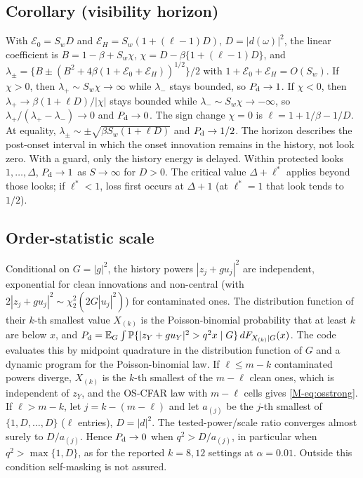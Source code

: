 \subsection{Corollary (visibility horizon)}
With $\mathcal E_0=S_wD$ and $\mathcal E_H=S_w(1+(\ell-1)D)$, $D=|d(\omega)|^2$, the linear coefficient is $B=1-\beta+S_w\chi$, $\chi=D-\beta\{1+(\ell-1)D\}$, and $\lambda_\pm=\{B\pm(B^2+4\beta(1+\mathcal E_0+\mathcal E_H))^{1/2}\}/2$ with $1+\mathcal E_0+\mathcal E_H=O(S_w)$. If $\chi>0$, then $\lambda_+\sim S_w\chi\to\infty$ while $\lambda_-$ stays bounded, so $P_{\rm d}\to1$. If $\chi<0$, then $\lambda_+\to\beta(1+\ell D)/|\chi|$ stays bounded while $\lambda_-\sim S_w\chi\to-\infty$, so $\lambda_+/(\lambda_+-\lambda_-)\to0$ and $P_{\rm d}\to0$. The sign change $\chi=0$ is $\ell=1+1/\beta-1/D$. At equality, $\lambda_\pm\sim\pm\sqrt{\beta S_w(1+\ell D)}$ and $P_{\rm d}\to1/2$. The horizon describes the post-onset interval in which the onset innovation remains in the history, not look zero. With a guard, only the history energy is delayed. Within protected looks $1,\ldots,\Delta$, $P_{\rm d}\to1$ as $S\to\infty$ for $D>0$. The critical value $\Delta+\ell^*$ applies beyond those looks; if $\ell^*<1$, loss first occurs at $\Delta+1$ (at $\ell^*=1$ that look tends to $1/2$).

\subsection{Order-statistic scale}
Conditional on $G=|g|^2$, the history powers $|z_j+gu_j|^2$ are independent, exponential for clean innovations and non-central (with $2|z_j+gu_j|^2\sim\chi^2_2(2G|u_j|^2)$) for contaminated ones. The distribution function of their $k$-th smallest value $X_{(k)}$ is the Poisson-binomial probability that at least $k$ are below $x$, and $P_{\rm d}=\mathbb E_G\int\mathbb{P}\{|z_Y+gu_Y|^2>q^2x\mid G\}\,dF_{X_{(k)}\mid G}(x)$. The code evaluates this by midpoint quadrature in the distribution function of $G$ and a dynamic program for the Poisson-binomial law. If $\ell\le m-k$ contaminated powers diverge, $X_{(k)}$ is the $k$-th smallest of the $m-\ell$ clean ones, which is independent of $z_Y$, and the OS-CFAR law with $m-\ell$ cells gives \eqref{M-eq:osstrong}. If $\ell>m-k$, let $j=k-(m-\ell)$ and let $a_{(j)}$ be the $j$-th smallest of $\{1,D,\ldots,D\}$ ($\ell$ entries), $D=|d|^2$. The tested-power/scale ratio converges almost surely to $D/a_{(j)}$. Hence $P_{\rm d}\to0$ when $q^2>D/a_{(j)}$, in particular when $q^2>\max\{1,D\}$, as for the reported $k=8,12$ settings at $\alpha=0.01$. Outside this condition self-masking is not assured.

